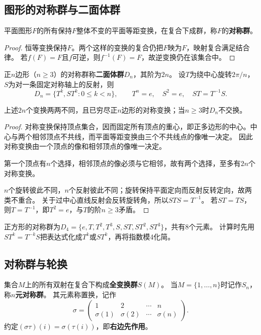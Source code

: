 \subsection*{图形的对称群与二面体群}
\begin{proposition}
平面图形$F$的所有保持$F$整体不变的平面等距变换，在复合下成群，称$F$的\textbf{对称群}。
\end{proposition}
\begin{proof}
恒等变换保持$F$。两个这样的变换的复合仍把$F$映为$F$，映射复合满足结合律。
若$f(F)=F$且$f$可逆，则$f^{-1}(F)=F$，故逆变换仍在该集合中。
\end{proof}

\begin{definition}
正$n$边形（$n\geq3$）的对称群称\textbf{二面体群}$D_n$，其阶为$2n$。
设$T$为绕中心旋转$2\pi/n$，$S$为对一条固定对称轴上的反射，则
\[
D_n=\{T^k,ST^k:0\leq k<n\},\qquad T^n=e,\quad S^2=e,\quad ST=T^{-1}S.
\]
\end{definition}

\begin{proposition}
上述$2n$个变换两两不同，且已穷尽正$n$边形的对称变换；当$n\geq3$时$D_n$不交换。
\end{proposition}
\begin{proof}
对称变换保持顶点集合，因而固定所有顶点的重心，即正多边形的中心。中心与两个相邻顶点不共线，而平面等距变换由三个不共线点的像唯一决定。
因此对称变换由一个顶点的像和相邻顶点的像唯一决定。

第一个顶点有$n$个选择，相邻顶点的像必须与它相邻，故有两个选择，至多有$2n$个对称变换。

$n$个旋转彼此不同，$n$个反射彼此不同；旋转保持平面定向而反射反转定向，故两类不重合。
关于过中心直线反射会反转旋转角，所以$STS=T^{-1}$。
若$ST=TS$，则$T=T^{-1}$，即$T^2=e$，与$T$的阶$n\geq3$矛盾。
\end{proof}

\begin{example}
正方形的对称群为$D_4=\{e,T,T^2,T^3,S,ST,ST^2,ST^3\}$，共有8个元素。
计算时先用$ST^k=T^{-k}S$把表达式化成$T^k$或$ST^k$，再将指数模4化简。
\end{example}

\subsection*{对称群与轮换}
\begin{definition}
集合$M$上的所有双射在复合下构成\textbf{全变换群}$S(M)$。
当$M=\{1,\ldots,n\}$时记作$S_n$，称\textbf{$n$元对称群}。
其元素称置换，记作
\[
\sigma=\begin{pmatrix}1&2&\cdots&n\\\sigma(1)&\sigma(2)&\cdots&\sigma(n)\end{pmatrix}.
\]
约定$(\sigma\tau)(i)=\sigma(\tau(i))$，即\textbf{右边先作用}。
\end{definition}

